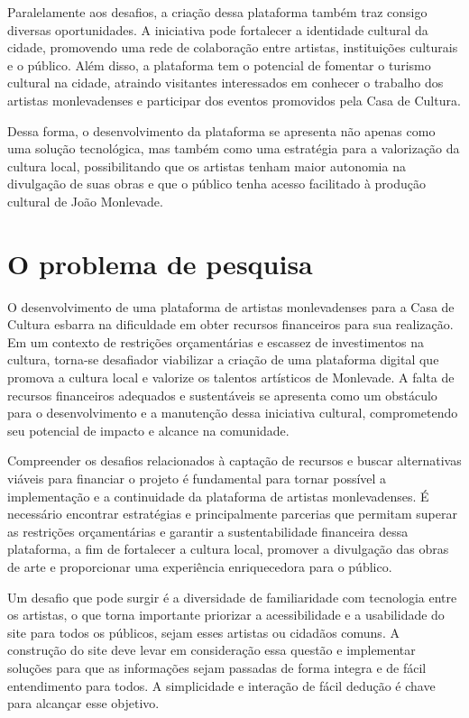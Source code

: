 Paralelamente aos desafios, a criação dessa plataforma também traz consigo diversas oportunidades. A iniciativa pode fortalecer a identidade cultural da cidade, promovendo uma rede de colaboração entre artistas, instituições culturais e o público. Além disso, a plataforma tem o potencial de fomentar o turismo cultural na cidade, atraindo visitantes interessados em conhecer o trabalho dos artistas monlevadenses e participar dos eventos promovidos pela Casa de Cultura.

Dessa forma, o desenvolvimento da plataforma se apresenta não apenas como uma solução tecnológica, mas também como uma estratégia para a valorização da cultura local, possibilitando que os artistas tenham maior autonomia na divulgação de suas obras e que o público tenha acesso facilitado à produção cultural de João Monlevade.

\section{O problema de pesquisa}
\label{sec:problema}

O desenvolvimento de uma plataforma de artistas monlevadenses para a Casa de Cultura esbarra na dificuldade em obter recursos financeiros para sua realização. Em um contexto de restrições orçamentárias e escassez de investimentos na cultura, torna-se desafiador viabilizar a criação de uma plataforma digital que promova a cultura local e valorize os talentos artísticos de Monlevade. A falta de recursos financeiros adequados e sustentáveis se apresenta como um obstáculo para o desenvolvimento e a manutenção dessa iniciativa cultural, comprometendo seu potencial de impacto e alcance na comunidade.

Compreender os desafios relacionados à captação de recursos e buscar alternativas viáveis para financiar o projeto é fundamental para tornar possível a implementação e a continuidade da plataforma de artistas monlevadenses. É necessário encontrar estratégias e principalmente parcerias que permitam superar as restrições orçamentárias e garantir a sustentabilidade financeira dessa plataforma, a fim de fortalecer a cultura local, promover a divulgação das obras de arte e proporcionar uma experiência enriquecedora para o público.

Um desafio que pode surgir é a diversidade de familiaridade com tecnologia entre os artistas, o que torna importante priorizar a acessibilidade e a usabilidade do site para todos os públicos, sejam esses artistas ou cidadãos comuns. A construção do site deve levar em consideração essa questão e implementar soluções para que as informações sejam passadas de forma integra e de fácil entendimento para todos. A simplicidade e interação de fácil dedução é chave para alcançar esse objetivo.

